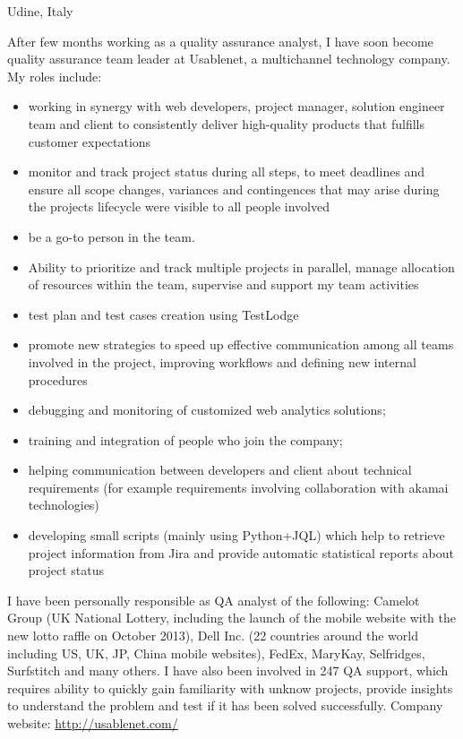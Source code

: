 \documentclass[10pt,a4paper]{moderncv}   %
\begin{document}
   {Udine, Italy}{}{After few months working as a quality assurance analyst, I
      have soon become
   quality assurance team leader at Usablenet, a multichannel technology
   company. 
   My roles include:
   \begin{itemize}
\item 
  working in synergy with  web
   developers, project manager, solution engineer team and client to
   consistently deliver high-quality
   products that fulfills customer expectations 
\item monitor and track project status during all steps, to meet deadlines
   and ensure all scope changes,
 variances and contingences that may arise during the 
 projects lifecycle were visible to all people involved
 \item  be a go-to person in the team.
 \item 
   Ability to prioritize and track multiple projects in parallel,
    manage  allocation of resources within the team, supervise and support my team
    activities
\item test plan and test cases creation using TestLodge
\item promote new strategies to speed up effective communication among all
   teams involved in the project,
   improving workflows and defining new internal procedures
\item debugging and monitoring of customized web analytics solutions;
\item training and integration of people who join the company;
\item helping communication between developers and client  
   about technical requirements (for example requirements involving
   collaboration with akamai technologies)
\item developing small scripts (mainly using Python+JQL) which help to retrieve project
 information from Jira and provide automatic statistical reports about project status
 \end{itemize} 
   I have been personally responsible as QA analyst of the following:
   Camelot Group (UK National Lottery, including the
   launch of the mobile website with the new lotto raffle on October 2013), Dell Inc. (22 countries
   around the world including US, UK, JP, China mobile websites), FedEx,
   MaryKay, Selfridges, Surfstitch and many others.
I have also been involved in 247 QA support, which requires ability to quickly gain
familiarity with unknow projects, provide insights to understand the problem and test if it has
been solved successfully.
Company website: \url{http://usablenet.com/}}
\end{document}
